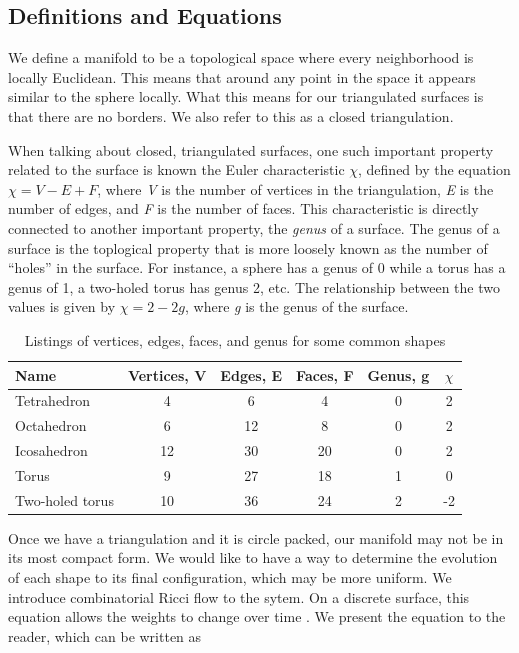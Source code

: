 \documentclass[12pt]{article}
\begin{document}
\subsection{Definitions and Equations}
\label{ricciDef}
We define a manifold to be a topological space where every neighborhood is locally Euclidean. This means that around any point in the space it appears similar to the sphere locally. What this means for our triangulated surfaces is that there are no borders. We also refer to this as a closed triangulation.\newline

\noindent When talking about closed, triangulated surfaces, one such important property related to the surface is known the Euler characteristic $\chi$, defined by the equation $\chi = V - E + F$, where \textit{V} is the number of vertices in the triangulation, \textit{E} is the number of edges, and \textit{F} is the number of faces. This characteristic is directly connected to another important property, the \textit{genus} of a surface. The genus of a surface is the toplogical property that is more loosely known as the number of ``holes'' in the surface. For instance, a sphere has a genus of 0 while a torus has a genus of 1, a two-holed torus has genus 2, etc. The relationship between the two values is given by $\chi = 2 - 2g$, where \textit{g} is the genus of the surface.\newline 

\begin{table}
\begin{tabular}{lccccc}
Name  &	Vertices, V &	Edges, E & Faces, F &	Genus, g & $\chi$\\
\hline 
Tetrahedron &	4 &	6 &	4 &	0 & 2\\
Octahedron 	&	6 &	12 &	8 & 0 &	 2\\
Icosahedron &	12 & 30 & 20 & 0	&	 2\\
Torus & 9 & 27 & 18 &	1 & 0\\
Two-holed torus & 10 & 36 & 24 &	2 & -2\\
\end{tabular}
\caption{Listings of vertices, edges, faces, and genus for some common shapes}
\label{EuChar}
\end{table}

\noindent Once we have a triangulation and it is circle packed, our manifold may not be in its most compact form. We would like to have a way to determine the evolution of each shape to its final configuration, which may be more uniform. We introduce combinatorial Ricci flow to the sytem. On a discrete surface, this equation allows the weights to change over time \cite{chowluo}. We present the equation to the reader, which can be written as
\end{document}
